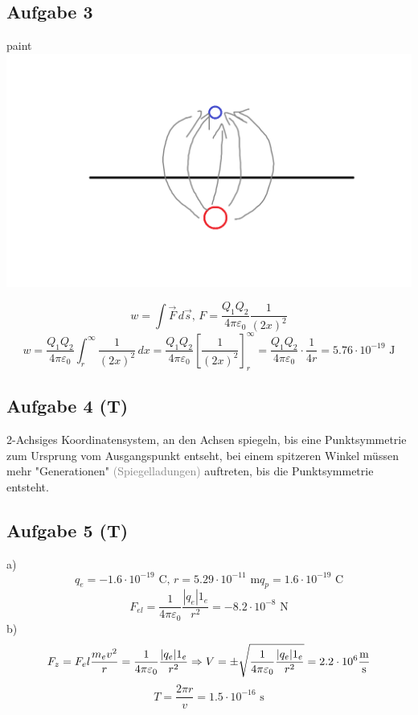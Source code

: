 \documentclass{article}
\begin{document}
\subsection*{Aufgabe 3}
\begin{center}paint
    \includegraphics{Abbildungen/Abb.2.png}
\end{center}
\begin{equation*}
    w = \int \vec{F}\,d\vec{s}, \,F=\frac{Q_1Q_2}{4\pi\varepsilon_0}\frac{1}{(2x)^2}
\end{equation*}
\begin{equation*}
    w = \frac{Q_1Q_2}{4\pi\varepsilon_0} \int_{r}^{\infty} \frac{1}{(2x)^2}\,dx = \frac{Q_1Q_2}{4\pi\varepsilon_0} \left[\frac{1}{(2x)^2}\right]^\infty_r = \frac{Q_1Q_2}{4\pi\varepsilon_0} \cdot \frac{1}{4r} = 5.76 \cdot 10^{-19} \text{ J}
\end{equation*}

\subsection*{Aufgabe 4 (T)}
2-Achsiges Koordinatensystem, an den Achsen spiegeln, bis eine Punktsymmetrie zum Ursprung vom Ausgangspunkt entseht, bei einem spitzeren Winkel müssen mehr "Generationen" \textcolor{gray}{(Spiegelladungen)} auftreten, bis die Punktsymmetrie entsteht.

\subsection*{Aufgabe 5 (T)}
a) \begin{equation*}
    q_e = -1.6 \cdot 10^{-19} \text{ C}, \, r = 5.29\cdot 10^{-11}\text{ m} q_p = 1.6 \cdot 10^{-19} \text{ C}
\end{equation*}
\begin{equation*}
    F_{el} = \frac{1}{4\pi\varepsilon_0}\frac{|q_e|1_e}{r^2} = -8.2 \cdot 10^{-8} \text{ N}
\end{equation*}
b)\begin{equation*}
    F_z = F_el\\\\
    \frac{m_ev^2}{r}=\frac{1}{4\pi\varepsilon_0}\frac{|q_e|1_e}{r^2} \Rightarrow V = \pm \sqrt{\frac{1}{4\pi\varepsilon_0}\frac{|q_e|1_e}{r^2}} = 2.2 \cdot 10^6 \mathrm{\frac{m}{s}}
\end{equation*}
\begin{equation*}
    T = \frac{2\pi r}{v}=1.5 \cdot 10^{-16}\text{ s}
\end{equation*}
\end{document}
